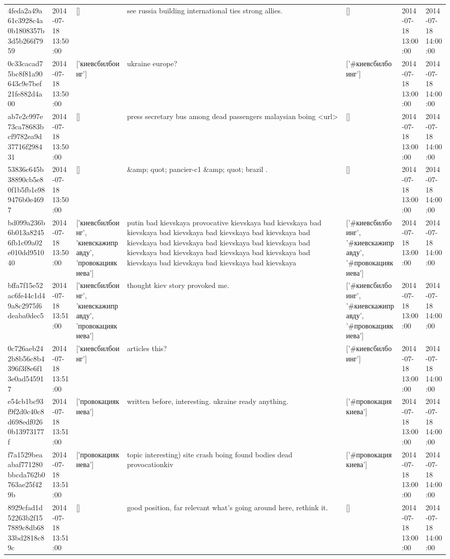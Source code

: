 \begin{tabular}{lllllll}
4feda2a49a61c3928c4a0b1808357b3d5b266f7959 & 2014-07-18 13:50:00 & [] & see russia building international ties strong allies. & [] & 2014-07-18 13:00:00 & 2014-07-18 14:00:00 \\
0c33cacad75bc8f81a90643c9e7bef21fe882d4a00 & 2014-07-18 13:50:00 & ['киевсбилбоинг'] & ukraine europe? & ['#киевсбилбоинг'] & 2014-07-18 13:00:00 & 2014-07-18 14:00:00 \\
ab7e2c997e73ca78683bcf9782ea9d37716f298431 & 2014-07-18 13:50:00 & [] & press secretary bus among dead passengers malaysian boing <url> & [] & 2014-07-18 13:00:00 & 2014-07-18 14:00:00 \\
53836c645b38890cb5e80f1b5fb1e989476b0e4697 & 2014-07-18 13:50:00 & [] & \&amp; quot; pancier-c1 \&amp; quot; brazil . & [] & 2014-07-18 13:00:00 & 2014-07-18 14:00:00 \\
bd099a236b6b013a82456fb1c09a02e010dd951040 & 2014-07-18 13:50:00 & ['киевсбилбоинг', 'киевскажиправду', 'провокациякиева'] & putin bad kievskaya provocative kievskaya bad kievskaya bad kievskaya bad kievskaya bad kievskaya bad kievskaya bad kievskaya bad kievskaya bad kievskaya bad kievskaya bad kievskaya bad kievskaya bad kievskaya bad kievskaya bad kievskaya bad kievskaya bad kievskaya bad kievskaya & ['#киевсбилбоинг', '#киевскажиправду', '#провокациякиева'] & 2014-07-18 13:00:00 & 2014-07-18 14:00:00 \\
bffa7f15e52ac6fe44c1d49a8c2975f6deaba0dec5 & 2014-07-18 13:51:00 & ['киевсбилбоинг', 'киевскажиправду', 'провокациякиева'] & thought kiev story provoked me. & ['#киевсбилбоинг', '#киевскажиправду', '#провокациякиева'] & 2014-07-18 13:00:00 & 2014-07-18 14:00:00 \\
0c726aeb242b8b56c8b4396f3f8e6f13e0ad545917 & 2014-07-18 13:51:00 & ['киевсбилбоинг'] & articles this? & ['#киевсбилбоинг'] & 2014-07-18 13:00:00 & 2014-07-18 14:00:00 \\
e54cb1bc93f9f2d0c40c8d698edf0260b13973177f & 2014-07-18 13:51:00 & ['провокациякиева'] & written before, interesting. ukraine ready anything. & ['#провокациякиева'] & 2014-07-18 13:00:00 & 2014-07-18 14:00:00 \\
f7a1529beaabaf771280bbcda762b0763ae25f429b & 2014-07-18 13:51:00 & ['провокациякиева'] & topic interesting) site crash boing found bodies dead provocationkiv & ['#провокациякиева'] & 2014-07-18 13:00:00 & 2014-07-18 14:00:00 \\
8929cfad1d52263b2f157889c8db6833bd2818c89c & 2014-07-18 13:51:00 & [] & good position, far relevant what's going around here, rethink it. & [] & 2014-07-18 13:00:00 & 2014-07-18 14:00:00 \\

\end{tabular}
